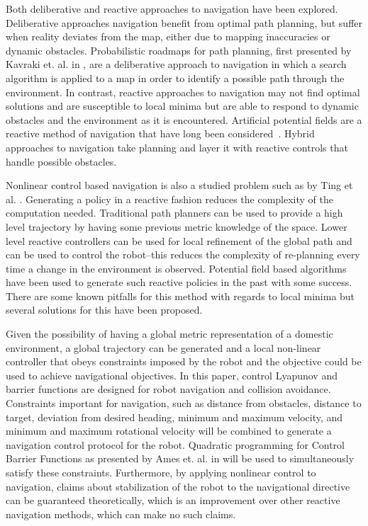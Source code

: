 \documentclass[journal]{IEEEconf}
\begin{document}
Both deliberative and reactive approaches to navigation have been explored. Deliberative approaches navigation benefit from optimal path planning, but suffer when reality deviates from the map, either due to mapping inaccuracies or dynamic obstacles. Probabilistic roadmaps for path planning, first presented by Kavraki et. al. in \cite{kavraki1996}, are a deliberative approach to navigation in which a search algorithm is applied to a map in order to identify a possible path through the environment. In contrast, reactive approaches to navigation may not find optimal solutions and are susceptible to local minima but are able to respond to dynamic obstacles and the environment as it is encountered. Artificial potential fields are a reactive method of navigation that have long been considered~\cite{khatib1985}. Hybrid approaches to navigation take planning and layer it with reactive controls that handle possible obstacles.

Nonlinear control based navigation is also a studied problem such as by Ting et al. \cite{ting2014reactive}. Generating a policy in a reactive fashion reduces the complexity of the computation needed. Traditional path planners can be used to provide a high level trajectory by having some previous metric knowledge of the space. Lower level reactive controllers can be used for local refinement of the global path and can be used to control the robot--this reduces the complexity of re-planning every time a change in the environment is observed. Potential field based algorithms have been used to generate such reactive policies in the past with some success. There are some known pitfalls for this method with regards to local minima but several solutions for this have been proposed.

Given the possibility of having a global metric representation of a domestic environment, a global trajectory can be generated and a local non-linear controller that obeys constraints imposed by the robot and the objective could be used to achieve navigational objectives. In this paper, control Lyapunov and barrier functions are designed for robot navigation and collision avoidance. Constraints important for navigation, such as distance from obstacles, distance to target, deviation from desired heading, minimum and maximum velocity, and minimum and maximum rotational velocity will be combined to generate a navigation control protocol for the robot. Quadratic programming for Control Barrier Functions as presented by Ames et. al. in \cite{amesACC} will be used to simultaneously satisfy these constraints. Furthermore, by applying nonlinear control to navigation, claims about stabilization of the robot to the navigational directive can be guaranteed theoretically, which is an improvement over other reactive navigation methods, which can make no such claims.
\end{document}

